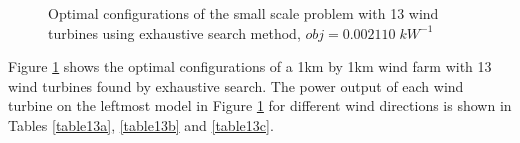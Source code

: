 \begin{figure}[H]
            \qquad
            \qquad
            \caption{Optimal configurations of the small scale problem with 13 wind turbines using exhaustive search method, $obj=0.002110\;kW^{-1}$}
            \label{small13}
        \end{figure}
        
        Figure \ref{small13} shows the optimal configurations of a 1km by 1km wind farm with 13 wind turbines found by exhaustive search. The power output of each wind turbine on the leftmost model in Figure \ref{small13} for different wind directions is shown in Tables \ref{table13a}, \ref{table13b} and \ref{table13c}.
        
